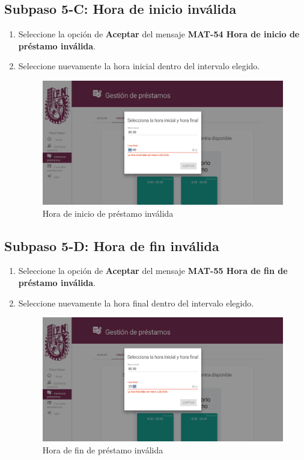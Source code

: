 \subsection{Subpaso 5-C: Hora de inicio inválida}
\begin{enumerate}
	\item Seleccione la opción de \textbf{Aceptar} del mensaje
\textbf{MAT-54 Hora de inicio de préstamo inválida}.
\item Seleccione nuevamente la hora inicial dentro del intervalo elegido.
\begin{figure}[hbtp]
	\includegraphics[scale=0.3]{images/Interfaz/MAT-54 Hora de inicio de préstamo inválida.png}
	\caption{Hora de inicio de préstamo inválida}
	\end{figure}
\end{enumerate}

\subsection{Subpaso 5-D: Hora de fin inválida}
\begin{enumerate}
	\item Seleccione la opción de \textbf{Aceptar} del mensaje
\textbf{MAT-55 Hora de fin de préstamo inválida}.
\item Seleccione nuevamente la hora final dentro del intervalo elegido.
\begin{figure}[hbtp]
	\includegraphics[scale=0.3]{images/Interfaz/MAT-55 Hora de fin de préstamo inválida.png}
	\caption{Hora de fin de préstamo inválida}
	\end{figure}
\end{enumerate}

